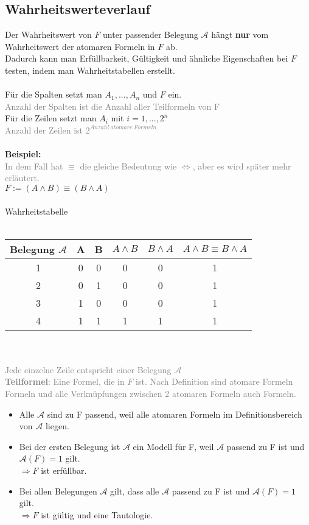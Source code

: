 \documentclass{article}
\begin{document}
	\subsection{Wahrheitswerteverlauf}
	Der Wahrheitswert von $F$ unter passender Belegung $\mathcal{A}$ hängt \textbf{nur} vom Wahrheitswert der atomaren Formeln in $F$ ab. \\
	Dadurch kann man Erfüllbarkeit, Gültigkeit und ähnliche Eigenschaften bei $F$ testen, indem man Wahrheitstabellen erstellt. \\
	\\
	Für die Spalten setzt man $A_1, ..., A_n$ und $F$ ein. \\
	\textcolor{gray}{Anzahl der Spalten ist die Anzahl aller Teilformeln von F} \\
	Für die Zeilen setzt man $A_i$ mit $i = 1, ..., 2^n$ \\
	\textcolor{gray}{Anzahl der Zeilen ist $2^{Anzahl \: atomare \: Formeln}$}\\
	\\
	\textbf{Beispiel:} \\
	\textcolor{gray}{In dem Fall hat $\equiv$ die gleiche Bedeutung wie $\Leftrightarrow$, aber es wird später mehr erläutert.} \\
	$F:= (A \wedge B) \equiv (B \wedge A)$ \\
	\\
	Wahrheitstabelle \\
	\\
	\begin{tabular}{|c|c|c|c|c|c|}
		\hline
		Belegung $\mathcal{A}$ & A & B & $A \wedge B$ & $B \wedge A$ & $A \wedge B \equiv B \wedge A$ \\ 
		\hline
		1 & 0 & 0 & 0 & 0 & 1 \\
		\hline
		2 & 0 & 1 & 0 & 0 & 1 \\
		\hline
		3 & 1 & 0 & 0 & 0 & 1 \\
		\hline
		4 & 1 & 1 & 1 & 1 & 1 \\
		\hline
	\end{tabular}
	\\
	\\
	\textcolor{gray}{Jede einzelne Zeile entspricht einer Belegung $\mathcal{A}$} \\
	\textcolor{gray}{\textbf{Teilformel}: Eine Formel, die in $F$ ist. Nach Definition sind atomare Formeln Formeln und alle Verknüpfungen zwischen 2 atomaren Formeln auch Formeln.}
	\begin{itemize}
		\item Alle $\mathcal{A}$ sind zu F passend, weil alle atomaren Formeln im Definitionsbereich von $\mathcal{A}$ liegen.
		\item Bei der ersten Belegung ist $\mathcal{A}$ ein Modell für F, weil $\mathcal{A}$ passend zu F ist und $\mathcal{A}(F)=1$ gilt. \\
		$\Rightarrow F$ ist erfüllbar.
		\item Bei allen Belegungen $\mathcal{A}$ gilt, dass alle $\mathcal{A}$ passend zu F ist und $\mathcal{A}(F) = 1$ gilt.  \\
		$\Rightarrow F$ ist gültig und eine Tautologie.
	\end{itemize}
\end{document}
